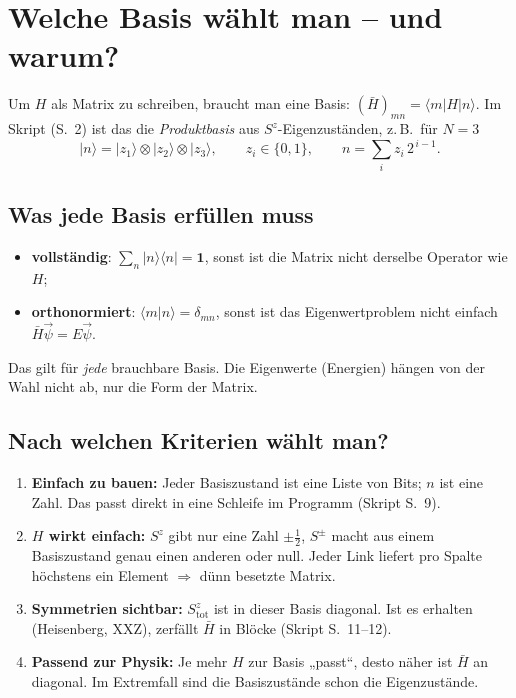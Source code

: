 \documentclass[11pt,a4paper]{article}
\newcommand{\ket}[1]{\lvert #1\rangle}
\newcommand{\bra}[1]{\langle #1\rvert}
\newcommand{\Hbar}{\bar H}
\begin{document}
\section{Welche Basis wählt man -- und warum?}

Um $H$ als Matrix zu schreiben, braucht man eine Basis: $(\Hbar)_{mn} = \bra m H\ket n$. Im Skript (S.~2) ist das die \emph{Produktbasis} aus $S^z$-Eigenzuständen, z.\,B.\ für $N=3$
\[
\ket n = \ket{z_1}\otimes\ket{z_2}\otimes\ket{z_3},\qquad z_i\in\{0,1\},\qquad n = \sum_i z_i\,2^{\,i-1}.
\]

\subsection{Was jede Basis erfüllen muss}
\begin{itemize}[itemsep=2pt]
\item \textbf{vollständig}: $\sum_n\ket n\bra n = \mathbf 1$, sonst ist die Matrix nicht derselbe Operator wie $H$;
\item \textbf{orthonormiert}: $\langle m|n\rangle = \delta_{mn}$, sonst ist das Eigenwertproblem nicht einfach $\Hbar\vec\psi = E\vec\psi$.
\end{itemize}
Das gilt für \emph{jede} brauchbare Basis. Die Eigenwerte (Energien) hängen von der Wahl nicht ab, nur die Form der Matrix.

\subsection{Nach welchen Kriterien wählt man?}
\begin{warum}
\begin{enumerate}[leftmargin=*,itemsep=3pt]
\item \textbf{Einfach zu bauen:} Jeder Basiszustand ist eine Liste von Bits; $n$ ist eine Zahl. Das passt direkt in eine Schleife im Programm (Skript S.~9).
\item \textbf{$H$ wirkt einfach:} $S^z$ gibt nur eine Zahl $\pm\tfrac12$, $S^\pm$ macht aus einem Basiszustand genau einen anderen oder null. Jeder Link liefert pro Spalte höchstens ein Element $\Rightarrow$ dünn besetzte Matrix.
\item \textbf{Symmetrien sichtbar:} $S^z_\text{tot}$ ist in dieser Basis diagonal. Ist es erhalten (Heisenberg, XXZ), zerfällt $\Hbar$ in Blöcke (Skript S.~11--12).
\item \textbf{Passend zur Physik:} Je mehr $H$ zur Basis „passt“, desto näher ist $\Hbar$ an diagonal. Im Extremfall sind die Basiszustände schon die Eigenzustände.
\end{enumerate}
\end{warum}
\end{document}
